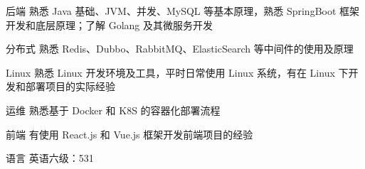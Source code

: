 

\begin{cvskills}


  \cvskill
    {后端} %
    {熟悉 Java 基础、JVM、并发、MySQL 等基本原理，熟悉 SpringBoot 框架开发和底层原理；了解 Golang 及其微服务开发 } %

  \cvskill
    {分布式} %
    {熟悉 Redis、Dubbo、RabbitMQ、ElasticSearch 等中间件的使用及原理} %


  \cvskill
    {Linux} %
    {熟悉 Linux 开发环境及工具，平时日常使用 Linux 系统，有在 Linux 下开发和部署项目的实际经验 } %

  \cvskill
    {运维} %
    {熟悉基于 Docker 和 K8S 的容器化部署流程} %

  \cvskill
    {前端} %
    {有使用 React.js 和 Vue.js 框架开发前端项目的经验} %

  \cvskill
    {语言} %
    {英语六级：531} %

\end{cvskills}
